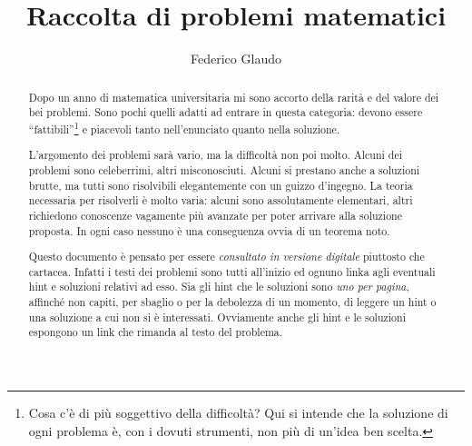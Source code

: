 \documentclass[a4paper,12pt]{article}
\title{Raccolta di problemi matematici}
\author{Federico Glaudo}
\newcounter{ProblemNumber}
\begin{document}
\maketitle

\begin{abstract}
	Dopo un anno di matematica universitaria mi sono accorto della rarità e del valore dei bei problemi. Sono pochi quelli adatti ad entrare in questa categoria: devono essere ``fattibili''\footnote{Cosa c'è di più soggettivo della difficoltà? Qui si intende che la soluzione di ogni problema è, con i dovuti strumenti, non più di un'idea ben scelta.} e piacevoli tanto nell'enunciato quanto nella soluzione.
	
	L'argomento dei problemi sarà vario, ma la difficoltà non poi molto. Alcuni dei problemi sono celeberrimi, altri misconosciuti. Alcuni si prestano anche a soluzioni brutte, ma tutti sono risolvibili elegantemente con un guizzo d'ingegno.
	La teoria necessaria per risolverli è molto varia: alcuni sono assolutamente elementari, altri richiedono conoscenze vagamente più avanzate per poter arrivare alla soluzione proposta. In ogni caso nessuno è una conseguenza ovvia di un teorema noto.

	Questo documento è pensato per essere \emph{consultato in versione digitale} piuttosto che cartacea. 
	Infatti i testi dei problemi sono tutti all'inizio ed ognuno linka agli eventuali hint e soluzioni relativi ad esso. Sia gli hint che le soluzioni sono \emph{uno per pagina}, affinché non capiti, per sbaglio o per la debolezza di un momento, di leggere un hint o una soluzione a cui non si è interessati. Ovviamente anche gli hint e le soluzioni espongono un link che rimanda al testo del problema. 
	
\end{abstract}
\clearpage

\tableofcontents
\clearpage




%
\addtocounter{ProblemNumber}{1}%
%
%
%
\end{document}
